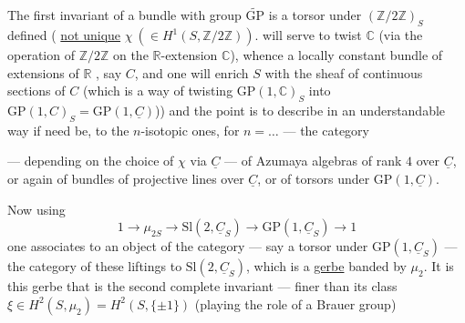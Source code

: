 The first invariant of a bundle with group $\widetilde{\mathrm{GP}}$
is a  torsor  under $(\mathbb Z/2\mathbb Z)_S$
 defined (
\uline{not unique} $\chi\ (\in H^1(S,\mathbb Z/2\mathbb Z))$.
 will serve to twist $\mathbb C$
(via the  operation of $\mathbb Z/2\mathbb Z$ on
the $\mathbb R$-extension $\mathbb C$),  whence a locally
constant bundle of   extensions
of $\mathbb R$ ,
say $C$, and one  will enrich $S$
with the sheaf  of continuous sections of
$C$ (which is a way of twisting
 $\mathrm{GP}(1,\mathbb C)_S$
into $\mathrm{GP}(1,C)_S=\mathrm{GP}(1,\underline C)$))
and the point is to  describe in an
understandable way   if need be,
to the \deleted{\unsure{$\infty$}}$n$-isotopic ones, for $n=\ldots$ --- the category

--- depending on the choice of $\chi$ via $\underline C$ --- of
Azumaya algebras of rank $4$ over $\underline C$,
or again of bundles of projective lines
over $\underline C$, or of torsors under $\mathrm{GP}(1,\underline C)$.

Now using  
\[
1\longrightarrow\mu_{2S}\longrightarrow\mathrm{Sl}(2,\underline C_S)
\longrightarrow\mathrm{GP}(1,\underline C_S)\longrightarrow1
\]
one associates to an object of the category
--- say a torsor under $\mathrm{GP}(1,\underline C_S)$ --- the
 category of these liftings to
$\mathrm{Sl}(2,\underline C_S)$,
which is a \uline{gerbe}  banded by $\mu_2$.
It is this gerbe that is the second
complete invariant --- finer than
its class  
$\xi\in H^2(S,\mu_2)=H^2(S,\{\pm1\})$
(playing the role
of a Brauer group)

